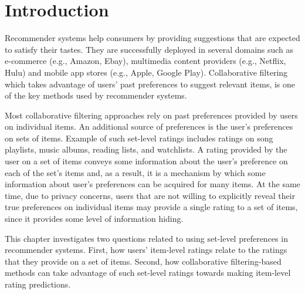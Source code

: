 \section{Introduction}


Recommender systems help consumers by providing suggestions that are
expected to satisfy their tastes. They are successfully  deployed in several domains
such as e-commerce (e.g., Amazon, Ebay), multimedia content providers (e.g., Netflix,
Hulu) and mobile app stores (e.g., Apple, Google Play).
Collaborative filtering~\cite{r30,koren2009matrix} which takes advantage of users' past preferences
to suggest relevant items, is one of the key methods
used by recommender systems.


Most collaborative filtering approaches rely on past preferences provided by
users on individual items.
An additional source of preferences is the user's preferences on sets of items.
Example of such set-level ratings includes
ratings on song playlists, music albums, reading lists,
and watchlists. 
A rating provided by the user on a set of items conveys some information about the
user's preference on each of the set's items and, as a result, it is a
mechanism by which some information about user's preferences can be acquired for
many items.
At the same time, due to privacy concerns, users that are not willing to
explicitly reveal their true preferences on individual items may provide a single
rating to a set of items, since it provides some level of information hiding.

This chapter investigates two questions related to using set-level preferences
in recommender systems. 
First, how users' item-level ratings relate to the
ratings that they provide on a set of items. Second, how collaborative
filtering-based methods
can take advantage of such set-level ratings towards making item-level rating
predictions.


